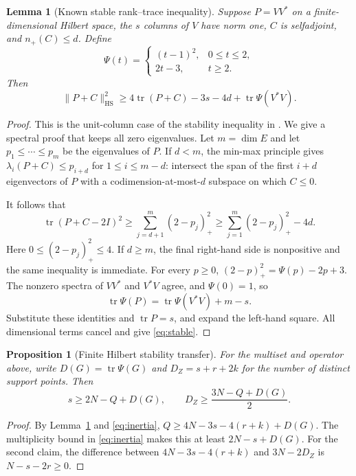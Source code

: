 \documentclass[11pt]{article}
\newtheorem{proposition}[theorem]{Proposition}
\newtheorem{lemma}[theorem]{Lemma}
\theoremstyle{remark}
\DeclareMathOperator{\tr}{tr}
\newcommand{\HS}{\mathrm{HS}}
\begin{document}
\begin{lemma}[Known stable rank--trace inequality]\label{lem:stable}
Suppose $P=VV^*$ on a finite-dimensional Hilbert space, the $s$ columns of
$V$ have norm one, $C$ is selfadjoint, and $n_+(C)\le d$. Define
\[
 \Psi(t)=\begin{cases}(t-1)^2,&0\le t\le2,\\2t-3,&t\ge2.
 \end{cases}
\]
Then
\begin{equation}\label{eq:stable}
 \|P+C\|_{\HS}^2\ge4\tr(P+C)-3s-4d+\tr\Psi(V^*V).
\end{equation}
\end{lemma}
\begin{proof}
This is the unit-column case of the stability inequality in
\cite[Section 2]{Ainta}. We give a spectral proof that keeps all zero
eigenvalues. Let $m=\dim E$ and let $p_1\le\cdots\le p_m$ be the
eigenvalues of $P$. If $d<m$, the min-max principle gives
$\lambda_i(P+C)\le p_{i+d}$ for $1\le i\le m-d$: intersect the span
of the first $i+d$ eigenvectors of $P$ with a codimension-at-most-$d$
subspace on which $C\le0$.

It follows that
\[
 \tr(P+C-2I)^2\ge\sum_{j=d+1}^m(2-p_j)_+^2
 \ge\sum_{j=1}^m(2-p_j)_+^2-4d.
\]
Here $0\le(2-p_j)_+^2\le4$. If $d\ge m$, the final right-hand side is
nonpositive and the same inequality is immediate. For every $p\ge0$,
$(2-p)_+^2=\Psi(p)-2p+3$. The nonzero spectra of $VV^*$ and $V^*V$
agree, and $\Psi(0)=1$, so
\[
 \tr\Psi(P)=\tr\Psi(V^*V)+m-s.
\]
Substitute these identities and $\tr P=s$, and expand the left-hand
square. All dimensional terms cancel and give \eqref{eq:stable}.
\end{proof}

\begin{proposition}[Finite Hilbert stability transfer]\label{prop:finite}
For the multiset and operator above, write $D(G)=\tr\Psi(G)$ and
$D_Z=s+r+2k$ for the number of distinct support points. Then
\begin{equation}\label{eq:finite}
 s\ge2N-Q+D(G),\qquad
 D_Z\ge\frac{3N-Q+D(G)}2.
\end{equation}
\end{proposition}
\begin{proof}
By Lemma~\ref{lem:stable} and \eqref{eq:inertia},
$Q\ge4N-3s-4(r+k)+D(G)$. The multiplicity bound in
\eqref{eq:inertia} makes this at least $2N-s+D(G)$. For the second
claim, the difference between $4N-3s-4(r+k)$ and $3N-2D_Z$ is
$N-s-2r\ge0$.
\end{proof}
\end{document}
